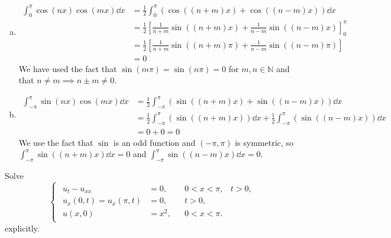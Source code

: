 \documentclass[plain]{pset}
\begin{document}
\begin{solution}
    \[\]
    \vspace{-4em}
    \begin{enumerate}[a.]
        \item
              \begin{align*}
                  \int_0^\pi \cos(nx)\cos(mx) \dd x & = \frac{1}{2}\int_0^\pi \left(\cos((n+m)x) + \cos((n-m)x)\right) \dd x                 \\
                                                    & = \frac{1}{2}\left[\frac{1}{n+m}\sin((n+m)x) + \frac{1}{n-m}\sin((n-m)x) \right]_0^\pi \\
                                                    & = \frac{1}{2}\left[\frac{1}{n+m}\sin((n+m)\pi) + \frac{1}{n-m}\sin((n-m)\pi) \right]   \\
                                                    & = 0
              \end{align*}
              We have used the fact that \(\sin(m\pi) = \sin(n\pi)= 0\) for \(m, n \in \mathbb{N}\) and that \(n \neq m \implies n \pm m \neq 0\).
        \item
              \begin{align*}
                  \int_{-\pi}^\pi \sin(nx)\cos(mx) \dd x & = \frac{1}{2} \int_{-\pi}^\pi \left(\sin((n+m)x) + \sin((n-m)x)\right) \dd x                                                 \\
                                                         & = \frac{1}{2} \int_{-\pi}^\pi \left(\sin((n+m)x) \right) \dd x + \frac{1}{2} \int_{-\pi}^\pi \left(\sin((n-m)x)\right) \dd x \\
                                                         & = 0 + 0 = 0
              \end{align*}
              We use the fact that \(\sin\) is an odd function and \((-\pi, \pi)\) is symmetric, so \(\int_{-\pi}^\pi \sin((n+m)x) \dd x = 0\) and \(\int_{-\pi}^\pi \sin((n-m)x) \dd x = 0\).
    \end{enumerate}
\end{solution}

\pagebreak

\begin{problem}
Solve
\[
    \begin{cases}
        \begin{aligned}
            u_t - u_{xx}        & = 0,   &  & 0 < x < \pi, & t > 0, \\
            u_x(0, t) = u_x(\pi, t) & = 0,   &  & t > 0,                \\
            u(x, 0)             & = x^2, &  & 0 < x < \pi.
        \end{aligned}
    \end{cases}
\]
explicitly.
\end{problem}
\end{document}
